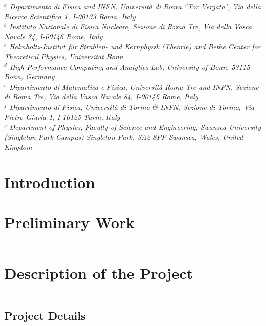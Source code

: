 \documentclass [a4paper, 11pt]{article}
\begin{document}
\textit{$^a$ Dipartimento di Fisica and INFN, Universit\`a di Roma ``Tor Vergata", Via della Ricerca Scientifica 1, I-00133 Roma, Italy}\\
\textit{$^b$ Instituto Nazionale di Fisica Nucleare, Sezione di Roma Tre, Via della Vasca Navale 84, I-00146 Rome, Italy }\\
\textit{$^c$ Helmholtz-Institut f{\"u}r Strahlen- und Kernphysik (Theorie) and Bethe Center for Theoretical Physics, Universit{\"a}t Bonn}\\
\textit{$^d$ High Performance Computing and Analytics Lab, University of Bonn, 53115 Bonn, Germany} \\
\textit{$^e$ Dipartimento di Matematica e Fisica, Universit\`a Roma Tre and INFN, Sezione di Roma Tre, Via della Vasca Navale 84, I-00146 Rome, Italy} \\
\textit{$^f$ Dipartimento di Fisica, Università di Torino \& INFN, Sezione di Torino, Via Pietro Giuria 1, I-10125 Turin, Italy}\\
\textit{$^g$ Department of Physics, Faculty of Science and Engineering, Swansea University (Singleton Park Campus) Singleton Park, SA2 8PP Swansea, Wales, United Kingdom}
\vfill

\newpage

\vfill
\tableofcontents
\vfill

\newpage

\section{Introduction}




\section{Preliminary Work}
\rule{\textwidth}{0.4pt} 




\section{Description of the Project}
\rule{\textwidth}{0.4pt}
\subsection{Project Details}
\end{document}
